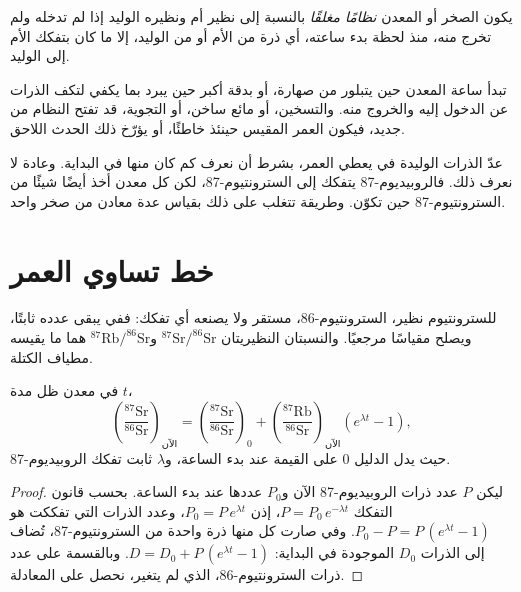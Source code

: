 \begin{definition}\label{def:g12:age-of-the-earth:closed-system}
يكون الصخر أو المعدن \emph{نظامًا مغلقًا} بالنسبة إلى
نظير أم ونظيره الوليد إذا لم تدخله ولم تخرج منه، منذ لحظة بدء ساعته،
أي ذرة من الأم أو من الوليد، إلا ما كان
بتفكك الأم إلى الوليد.
\end{definition}

تبدأ ساعة المعدن حين يتبلور من صهارة، أو بدقة
أكبر حين يبرد بما يكفي لتكف الذرات عن الدخول إليه والخروج
منه. والتسخين، أو مائع
ساخن، أو التجوية، قد تفتح النظام من جديد، فيكون العمر المقيس حينئذ
خاطئًا، أو يؤرّخ ذلك الحدث اللاحق.

عدّ الذرات الوليدة في  يعطي العمر، بشرط أن
نعرف كم كان منها في البداية. وعادة لا نعرف ذلك. فالروبيديوم-87
يتفكك إلى السترونتيوم-87، لكن كل معدن أخذ أيضًا شيئًا من السترونتيوم-87
حين تكوّن. وطريقة  تتغلب على ذلك بقياس عدة
معادن من صخر واحد.

\section{خط تساوي العمر}

للسترونتيوم نظير، السترونتيوم-86، مستقر ولا يصنعه أي
تفكك: ففي  يبقى عدده ثابتًا، ويصلح
مقياسًا مرجعيًا. والنسبتان النظيريتان $^{87}\mathrm{Sr}/^{86}\mathrm{Sr}$
و$^{87}\mathrm{Rb}/^{86}\mathrm{Sr}$ هما ما يقيسه مطياف الكتلة.

\begin{theorem}\label{thm:g12:age-of-the-earth:isochron}
في معدن ظل  مدة $t$،
\[
  \left(\frac{^{87}\mathrm{Sr}}{^{86}\mathrm{Sr}}\right)_{\text{الآن}}
  = \left(\frac{^{87}\mathrm{Sr}}{^{86}\mathrm{Sr}}\right)_{0}
  + \left(\frac{^{87}\mathrm{Rb}}{^{86}\mathrm{Sr}}\right)_{\text{الآن}}
  \left(e^{\lambda t} - 1\right),
\]
حيث يدل الدليل 0 على القيمة عند بدء الساعة، و$\lambda$
ثابت تفكك الروبيديوم-87.
\end{theorem}

\begin{proof}
ليكن $P$ عدد ذرات الروبيديوم-87 الآن و$P_0$ عددها عند بدء
الساعة. بحسب قانون التفكك $P = P_0\,e^{-\lambda t}$، إذن $P_0 = P\,e^{\lambda t}$،
وعدد الذرات التي تفككت هو $P_0 - P = P\,(e^{\lambda t}-1)$.
وفي  صارت كل منها ذرة واحدة من السترونتيوم-87، تُضاف
إلى الذرات $D_0$ الموجودة في البداية: $D = D_0 + P\,(e^{\lambda
t}-1)$. وبالقسمة على عدد ذرات السترونتيوم-86، الذي لم يتغير،
نحصل على المعادلة.
\end{proof}

